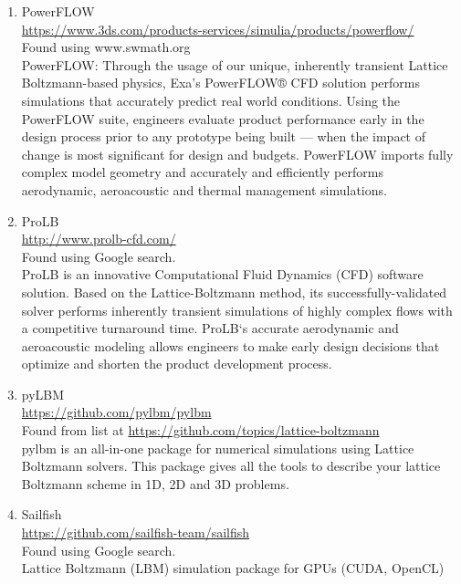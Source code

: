 \documentclass{article}
\begin{document}
\begin{enumerate}
	\item PowerFLOW \\
	\href{https://www.3ds.com/products-services/simulia/products/powerflow/}{https://www.3ds.com/products-services/simulia/products/powerflow/}\\
	Found using www.swmath.org \\
	PowerFLOW: Through the usage of our unique, inherently transient Lattice Boltzmann-based physics, Exa’s PowerFLOW® CFD solution performs simulations that accurately predict real world conditions. Using the PowerFLOW suite, engineers evaluate product performance early in the design process prior to any prototype being built — when the impact of change is most significant for design and budgets. PowerFLOW imports fully complex model geometry and accurately and efficiently performs aerodynamic, aeroacoustic and thermal management simulations.
	
	\item ProLB \\
	\href{http://www.prolb-cfd.com/}{http://www.prolb-cfd.com/}
	\\
	Found using Google search.\\
	ProLB is an innovative Computational Fluid Dynamics (CFD) software solution. Based on the Lattice-Boltzmann method, its successfully-validated solver performs inherently transient simulations of highly complex flows with a competitive turnaround time. ProLB‘s accurate aerodynamic and aeroacoustic modeling allows engineers to make early design decisions that optimize and shorten the product development process.
	
	\item pyLBM
	\\
	\href{https://github.com/pylbm/pylbm}{https://github.com/pylbm/pylbm}
	\\
	Found from list at \href{https://github.com/topics/lattice-boltzmann}{https://github.com/topics/lattice-boltzmann}\\
	pylbm is an all-in-one package for numerical simulations using Lattice Boltzmann solvers.
	This package gives all the tools to describe your lattice Boltzmann scheme in 1D, 2D and 3D problems.
	
	\item Sailfish \\
	\href{https://github.com/sailfish-team/sailfish}{https://github.com/sailfish-team/sailfish}
	\\
	Found using Google search.\\
	Lattice Boltzmann (LBM) simulation package for GPUs (CUDA, OpenCL)
	

\end{enumerate}
\end{document}

